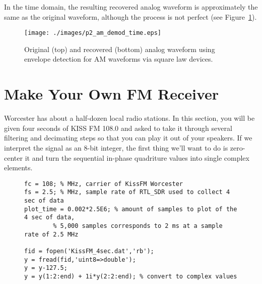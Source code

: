\documentclass[letterpaper,12pt]{article}
\begin{document}
In the time domain, the resulting recovered analog waveform is approximately the same as the original waveform, although the process is not perfect (see Figure~\ref{f:p2_am_demod_time}).

 
\begin{figure}[h]
 \centering
 \texttt{[image: ./images/p2\_am\_demod\_time.eps]}
 \caption{Original (top) and recovered (bottom) analog waveform using envelope detection for AM waveforms via square law devices.}\label{f:p2_am_demod_time}
\end{figure}


\section{Make Your Own FM Receiver}

Worcester has about a half-dozen local radio stations. In this section, you will be given four seconds of KISS FM 108.0 and asked to take it through several filtering and decimating steps so that you can play it out of your speakers. If we interpret the signal as an 8-bit integer, the first thing we'll want to do is zero-center it and turn the sequential in-phase quadriture values into single complex elements.

\begin{figure}[h]
\centering
\begin{minipage}[framed]{0.9\textwidth}
\begin{lstlisting}
fc = 108; % MHz, carrier of KissFM Worcester
fs = 2.5; % MHz, sample rate of RTL_SDR used to collect 4 sec of data
plot_time = 0.002*2.5E6; % amount of samples to plot of the 4 sec of data,
		% 5,000 samples corresponds to 2 ms at a sample rate of 2.5 MHz

fid = fopen('KissFM_4sec.dat','rb');
y = fread(fid,'uint8=>double');
y = y-127.5;
y = y(1:2:end) + 1i*y(2:2:end); % convert to complex values
\end{lstlisting}
\end{minipage}
\captionsetup{labelformat=empty}
\end{figure}
\end{document}
